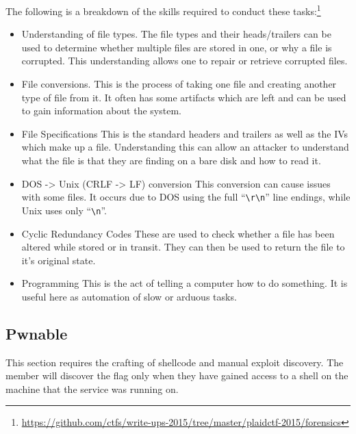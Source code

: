 \documentclass[a4paper,11pt]{report}
\begin{document}
			The following is a breakdown of the skills required to conduct these tasks:\footnote{\url{https://github.com/ctfs/write-ups-2015/tree/master/plaidctf-2015/forensics}}
			\begin{itemize}
				\item Understanding of file types. 
					The file types and their heads/trailers can be used to determine whether multiple files are stored in one, or why a file is corrupted. 
					This understanding allows one to repair or retrieve corrupted files.
				\item File conversions. 
					This is the process of taking one file and creating another type of file from it. 
					It often has some artifacts which are left and can be used to gain information about the system. 
				\item File Specifications
					This is the standard headers and trailers as well as the IVs which make up a file. 
					Understanding this can allow an attacker to understand what the file is that they are finding on a bare disk and how to read it. 
				\item DOS -> Unix (CRLF -> LF) conversion
					This conversion can cause issues with some files. 
					It occurs due to DOS using the full ``\verb+\r\n+'' line endings, while Unix uses only ``\verb+\n+''. 
				\item Cyclic Redundancy Codes
					These are used to check whether a file has been altered while stored or in transit. 
					They can then be used to return the file to it's original state. 
				\item Programming
					This is the act of telling a computer how to do something. 
					It is useful here as automation of slow or arduous tasks. 
			\end{itemize}

		\subsection{Pwnable}
			This section requires the crafting of shellcode and manual exploit discovery. 
			The member will discover the flag only when they have gained access to a shell on the machine that the service was running on. 
\end{document}
